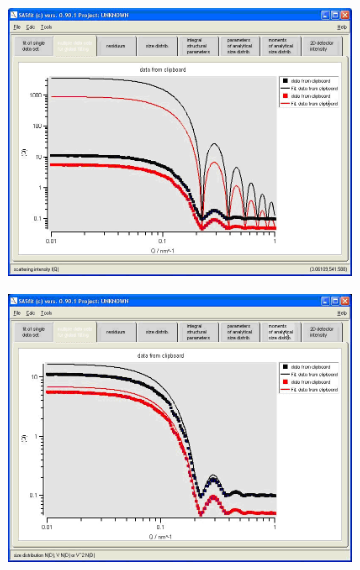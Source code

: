 \begin{figure}[htb]
\centering
\begin{subfigure}[b]{.48\textwidth}
   \centering
   \includegraphics[width=\textwidth]{QTmultiplefitUI5.png}
   \label{fig:QTmultiplefitUI5}
\end{subfigure}
\hfill
\begin{subfigure}[b]{.48\textwidth}
   \centering
  \includegraphics[width=\textwidth]{QTmultiplefitUI6.png}
   \label{fig:QTmultiplefitUI6}
\end{subfigure}
\hfill
\begin{subfigure}[b]{.48\textwidth}
   \centering

\end{subfigure}
\end{figure}
